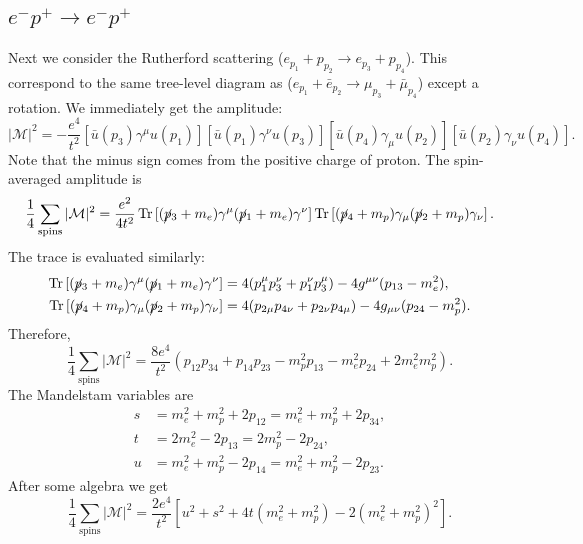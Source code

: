 \documentclass[aps,prb,superscriptaddress,nofootinbib]{revtex4}
\def \Tr{\operatorname{Tr}}
\begin{document}
\subsection{$e^- p^+ \rightarrow e^- p^+$}
Next we consider the Rutherford scattering ($e_{p_1} + p_{p_2} \rightarrow e_{p_3} + p_{p_4}$).
This correspond to the same tree-level diagram as ($e_{p_1} + \bar{e}_{p_2} \rightarrow \mu_{p_3} + \bar{\mu}_{p_4}$) except a rotation.
We immediately get the amplitude:
\begin{equation}
	|\mathcal M|^2 = -\frac{e^4}{t^2} \left[\bar u(p_3) \gamma^\mu u(p_1) \right] \left[\bar u(p_1) \gamma^\nu u(p_3) \right] \left[\bar u(p_4) \gamma_\mu u(p_2)\right] \left[\bar u(p_2) \gamma_\nu u(p_4)\right].
\end{equation}
Note that the minus sign comes from the positive charge of proton.
The spin-averaged amplitude is
\begin{equation}
	\frac{1}{4}\sum_{\mathrm{spins}}|\mathcal M|^2 
	= \frac{e^2}{4t^2} 
	\Tr\left[(\cancel p_3 +m_e) \gamma^\mu (\cancel{p}_1 + m_e) \gamma^\nu \right] 
	\Tr\left[(\cancel p_4+m_p) \gamma_\mu (\cancel p_2 +m_p) \gamma_\nu \right].
\end{equation}
The trace is evaluated similarly:
\begin{equation}
\begin{aligned}
	\Tr\left[(\cancel p_3 +m_e) \gamma^\mu (\cancel{p}_1 + m_e) \gamma^\nu \right] 
	&= 4 (p_{1}^{\mu} p_{3}^{\nu} + p_{1}^{\nu} p_{3}^{\mu}) - 4g^{\mu\nu}(p_{13} - m_e^2), \\
	\Tr\left[(\cancel p_4+m_p) \gamma_\mu (\cancel p_2 +m_p) \gamma_\nu \right] 
	&= 4 (p_{2\mu} p_{4\nu} + p_{2\nu} p_{4\mu}) - 4g_{\mu\nu}(p_{24} - m_p^2).
\end{aligned}
\end{equation}
Therefore,
\begin{equation}
	\frac{1}{4}\sum_{\mathrm{spins}}|\mathcal M|^2 
	= \frac{8 e^{4}}{t^{2}}\left(p_{12} p_{34}+p_{14} p_{23} - m_{p}^{2} p_{13} - m_{e}^{2} p_{24}+2 m_{e}^{2} m_{p}^{2}\right).
\end{equation}
The Mandelstam variables are
\begin{equation}
\begin{aligned}
	s &= m_{e}^{2} + m_p^2 + 2 p_{12} = m_e^2 + m_{p}^{2}+2 p_{34}, \\
	t &= 2 m_{e}^{2}-2 p_{13} = 2m_{p}^{2} -2 p_{24}, \\
	u &= m_{e}^{2} + m_p^2 - 2 p_{14} = m_{e}^{2} + m_p^2 - 2 p_{23}.
\end{aligned}
\end{equation}
After some algebra we get
\begin{equation}
	\frac{1}{4} \sum_{\mathrm{spins }}|\mathcal{M}|^{2}=\frac{2 e^{4}}{t^{2}}\left[u^{2}+s^{2}+4 t\left(m_{e}^{2}+m_{p}^{2}\right)-2\left(m_{e}^{2}+m_{p}^{2}\right)^{2}\right].
\end{equation}
\end{document}
